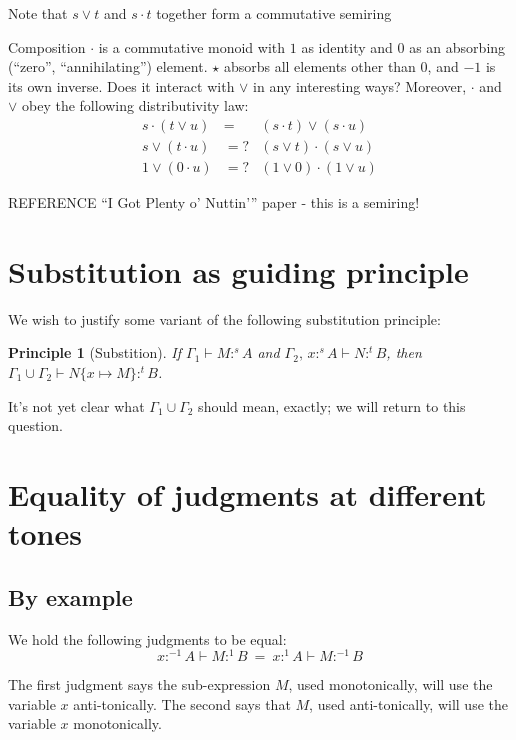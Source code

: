 \documentclass{article}
\newtheorem{principle}{Principle}
\newcommand{\todo}[1]{{\color{red}#1}}
\newcommand{\GG}{\Gamma}
\newcommand{\sub}[1]{\{{#1}\}}
\newcommand{\tm}{\ensuremath{1}}     %
\newcommand{\ta}{\ensuremath{{-1}}}    %
\newcommand{\ti}{\ensuremath{\star}} %
\newcommand{\tb}{\ensuremath{0}}     %
\newcommand{\tc}{\cdot}         %
\newcommand{\h}[3]{#1 :^{#3}\! {#2}}
\newcommand{\hm}[2]{\h{#1}{#2}{\tm}}
\newcommand{\ha}[2]{\h{#1}{#2}{\ta}}
\begin{document}
Note that $s \vee t$ and $s \tc t$ together form a commutative semiring

Composition $\tc$ is a commutative monoid with $\tm$ as identity and $\tb$ as an
absorbing (``zero'', ``annihilating'') element. $\ti$ absorbs all elements other
than $\tb$, and $\ta$ is its own inverse. \todo{Does it interact with $\vee$ in
  any interesting ways?} Moreover, $\tc$ and $\vee$ obey the following
distributivity law:
\begin{eqnarray}
  s \tc (t \vee u) &=& (s \tc t) \vee (s \tc u)\\
  s \vee (t \tc u) &=?& (s \vee t) \tc (s \vee u)\\
  1 \vee (0 \tc u) &=?& (1 \vee 0) \tc (1 \vee u)
\end{eqnarray}

\todo{REFERENCE ``I Got Plenty o' Nuttin'{}'' paper - this is a semiring!}


\section{Substitution as guiding principle}

We wish to justify some variant of the following substitution principle:

\begin{principle}[Substition]
  If $\GG_1 \vdash \h{M}{A}{s}$ and $\GG_2,\, \h{x}{A}{s} \vdash \h{N}{B}{t}$,
  then \(\GG_1 \cup \GG_2 \vdash \h{N\sub{x \mapsto M}}{B}{t}\).
\end{principle}

It's not yet clear what $\GG_1 \cup \GG_2$ should mean, exactly; \todo{we will
  return to this question.}


\section{Equality of judgments at different tones}

\subsection{By example}

We hold the following judgments to be equal:
\begin{equation}\label{eqn:ex1}
 \ha{x}{A} \vdash \hm{M}{B} ~=~ \hm{x}{A} \vdash \ha{M}{B}
\end{equation}

The first judgment says the sub-expression $M$, used monotonically, will use the
variable $x$ anti-tonically. The second says that $M$, used anti-tonically, will
use the variable $x$ monotonically.
\end{document}
